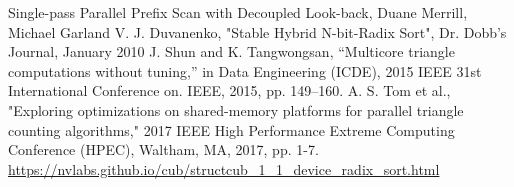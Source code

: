 \documentclass[conference]{IEEEtran}
\begin{document}
\begin{thebibliography}{00}
 Single-pass Parallel Prefix Scan with Decoupled Look-back, Duane Merrill, Michael Garland
 V. J. Duvanenko, "Stable Hybrid N-bit-Radix Sort", Dr. Dobb's Journal, January 2010
 J. Shun and K. Tangwongsan, “Multicore triangle computations without tuning,” in Data Engineering (ICDE), 2015 IEEE 31st International Conference on. IEEE, 2015, pp. 149–160.
 A. S. Tom et al., "Exploring optimizations on shared-memory platforms for parallel triangle counting algorithms," 2017 IEEE High Performance Extreme Computing Conference (HPEC), Waltham, MA, 2017, pp. 1-7.
 \url{https://nvlabs.github.io/cub/structcub_1_1_device_radix_sort.html}
\end{thebibliography}
\end{document}
